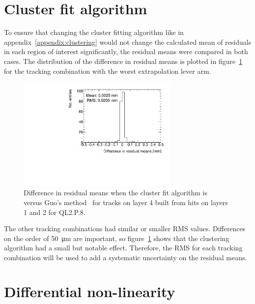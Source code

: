 \section{Cluster fit algorithm}
\label{appendix:systematics_cluster_fit_fcn}
To ensure that changing the cluster fitting algorithm like in appendix~\ref{appendix:clustering} would not change the calculated mean of residuals in each region of interest significantly, the residual means were compared in both cases. The distribution of the difference in residual means is plotted in figure~\ref{fig:cluster_fit_res_mean_compare_fits} for the tracking combination with the worst extrapolation lever arm.

\begin{figure}
    \centering
    \includegraphics[width = 0.7\textwidth]{figures/compare_residual_fits_QL2P08_3100V_2021-06-18_no_dnl_minus_QL2P08_3100V_2021-07-21_no_reclustering_layer4_fixedlayers12.pdf}
    \caption{Difference in residual means when the cluster fit algorithm is ~\cite{hatlo_developments_2005} versus Guo's method~\cite{guo_simple_2011} for tracks on layer 4 built from hits on layers 1 and 2 for QL2.P.8.}
    \label{fig:cluster_fit_res_mean_compare_fits}
\end{figure}

The other tracking combinations had similar or smaller RMS values. Differences on the order of \SI{50}{\micro\meter} are important, so figure~\ref{fig:cluster_fit_res_mean_compare_fits} shows that the clustering algorithm had a small but notable effect. Therefore, the RMS for each tracking combination will be used to add a systematic uncertainty on the residual means.

\section{Differential non-linearity}
\label{appendix:systematics_dnl}

